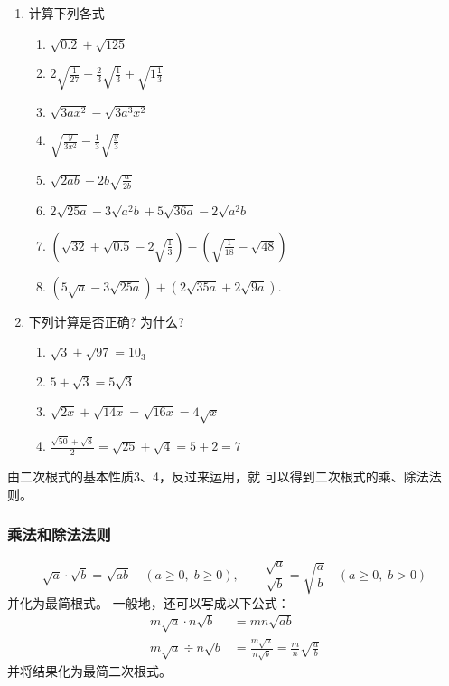 \begin{ex}
\begin{enumerate}
    \item 计算下列各式
\begin{enumerate}
    \item $\sqrt{0.2}+\sqrt{125}$
    \item $2\sqrt{\frac{1}{27}}-\frac{2}{3}\sqrt{\frac{1}{3}}+\sqrt{1\frac{1}{3}}$
    \item $\sqrt{3 a x^{2}}-\sqrt{3 a^{3} x^{2}}$
    \item $\sqrt{\frac{y}{3 x^{2}}}-\frac{1}{3} \sqrt{\frac{y}{3}}$
    \item $\sqrt{2 a b}-2 b \sqrt{\frac{a}{2 b}}$
    \item $2 \sqrt{25 a}-3 \sqrt{a^{2}b}+5 \sqrt{36 a}-2 \sqrt{a^{2} b}$
    \item  $\left(\sqrt{32}+\sqrt{0.5}-2 \sqrt{\frac{1}{3}}\right)-\left(\sqrt{\frac{1}{18}}-\sqrt{48}\right)$
    \item  $(5 \sqrt{a}-3 \sqrt{25 a})+(2 \sqrt{35 a}+2 \sqrt{9 a})$.
\end{enumerate}

\item 下列计算是否正确? 为什么?
\begin{enumerate}
    \item  $\sqrt{3}+\sqrt{97}=10_{3}$
    \item $5+\sqrt{3}=5 \sqrt{3}$
    \item $\sqrt{2 x}+\sqrt{14 x}=\sqrt{16 x}=4 \sqrt{x}$
    \item $\frac{\sqrt{50}+\sqrt{8}}{2}=\sqrt{25}+\sqrt{4}=5+2=7$
\end{enumerate}
\end{enumerate}
\end{ex}

由二次根式的基本性质3、4，反过来运用，就
可以得到二次根式的乘、除法法则。

\subsubsection{乘法和除法法则}
\[\sqrt{a}\cdot \sqrt{b}=\sqrt{ab}\quad (a\ge 0,\; b\ge 0),\qquad \frac{\sqrt{a}}{\sqrt{b}}=\sqrt{\frac{a}{b}}\quad (a\ge 0,\; b>0)  \]
并化为最简根式。
一般地，还可以写成以下公式：
\[\begin{split}
    m\sqrt{a}\cdot n\sqrt{b}&= mn\sqrt{ab}\\
    m\sqrt{a}\div n\sqrt{b}&=\frac{m\sqrt{a}}{n\sqrt{b}}=\frac{m}{n}\sqrt{\frac{a}{b}}
\end{split}\]
并将结果化为最简二次根式。

